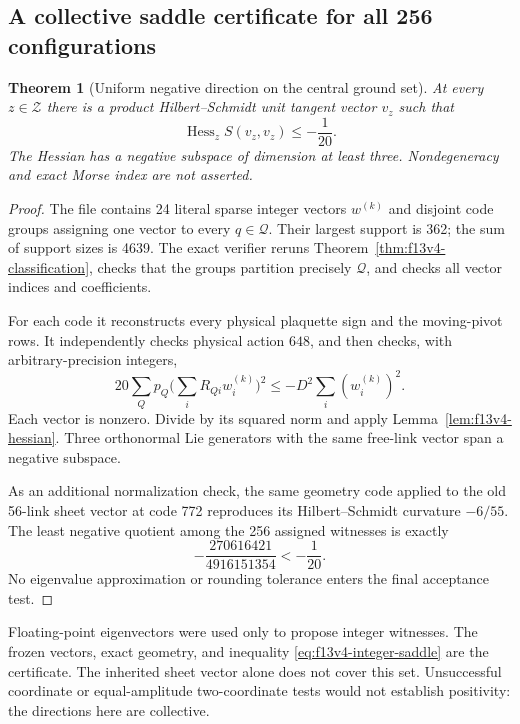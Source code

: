 \documentclass[11pt,oneside]{article}
\newtheorem{theorem}{Theorem}[section]
\DeclareMathOperator{\Hess}{Hess}
\begin{document}
\subsection{A collective saddle certificate for all 256 configurations}

\begin{theorem}[Uniform negative direction on the central ground set]
\label{thm:f13v4-saddles}
At every \(z\in\mathcal Z\) there is a product
Hilbert--Schmidt unit tangent vector \(v_z\) such that
\[
 \Hess_zS(v_z,v_z)\le-\frac1{20}.
\]
The Hessian has a negative subspace of dimension at
least three. Nondegeneracy and exact Morse index
are not asserted.
\end{theorem}

\begin{proof}
The file
contains 24 literal sparse integer vectors \(w^{(k)}\)
and disjoint code groups assigning one vector to
every \(q\in\mathcal Q\). Their largest support is
362; the sum of support sizes is 4639.
The exact verifier
reruns Theorem~\ref{thm:f13v4-classification}, checks
that the groups partition precisely \(\mathcal Q\),
and checks all vector indices and coefficients.

For each code it reconstructs every physical
plaquette sign and the moving-pivot rows. It independently
checks physical action \(648\), and then checks, with
arbitrary-precision integers,
\begin{equation}\label{eq:f13v4-integer-saddle}
 20\sum_Qp_Q\Big(\sum_iR_{Qi}w_i^{(k)}\Big)^2
       \le -D^2\sum_i(w_i^{(k)})^2 .
\end{equation}
Each vector is nonzero. Divide by its squared norm
and apply Lemma~\ref{lem:f13v4-hessian}. Three
orthonormal Lie generators with the same free-link
vector span a negative subspace.

As an additional normalization check, the same geometry
code applied to the old 56-link sheet vector at code
772 reproduces its Hilbert--Schmidt curvature
\(-6/55\). The least negative quotient among the
256 assigned witnesses is exactly
\[
 -\frac{270616421}{4916151354}<-\frac1{20}.
\]
No eigenvalue approximation or rounding tolerance
enters the final acceptance test.
\end{proof}

Floating-point eigenvectors were used only to propose
integer witnesses. The frozen vectors, exact geometry,
and inequality \eqref{eq:f13v4-integer-saddle} are the
certificate. The inherited sheet vector alone does
not cover this set. Unsuccessful coordinate or
equal-amplitude two-coordinate tests would not
establish positivity: the directions here are collective.
\end{document}
